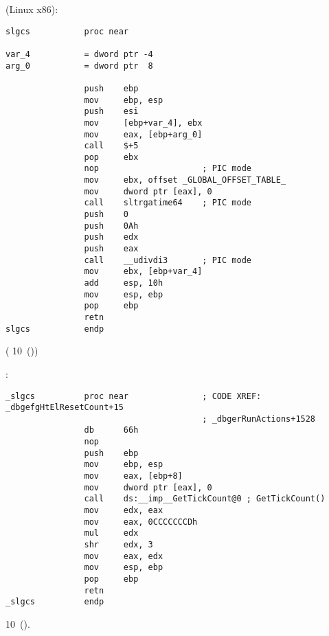   (Linux x86):

\begin{lstlisting}
slgcs           proc near

var_4           = dword ptr -4
arg_0           = dword ptr  8

                push    ebp
                mov     ebp, esp
                push    esi
                mov     [ebp+var_4], ebx
                mov     eax, [ebp+arg_0]
                call    $+5
                pop     ebx
                nop                     ; PIC mode
                mov     ebx, offset _GLOBAL_OFFSET_TABLE_
                mov     dword ptr [eax], 0
                call    sltrgatime64    ; PIC mode
                push    0
                push    0Ah
                push    edx
                push    eax
                call    __udivdi3       ; PIC mode
                mov     ebx, [ebp+var_4]
                add     esp, 10h
                mov     esp, ebp
                pop     ebp
                retn
slgcs           endp
\end{lstlisting}

(  
 10~())

:

\begin{lstlisting}
_slgcs          proc near               ; CODE XREF: _dbgefgHtElResetCount+15
                                        ; _dbgerRunActions+1528
                db      66h
                nop
                push    ebp
                mov     ebp, esp
                mov     eax, [ebp+8]
                mov     dword ptr [eax], 0
                call    ds:__imp__GetTickCount@0 ; GetTickCount()
                mov     edx, eax
                mov     eax, 0CCCCCCCDh
                mul     edx
                shr     edx, 3
                mov     eax, edx
                mov     esp, ebp
                pop     ebp
                retn
_slgcs          endp
\end{lstlisting}

  
 10~().


